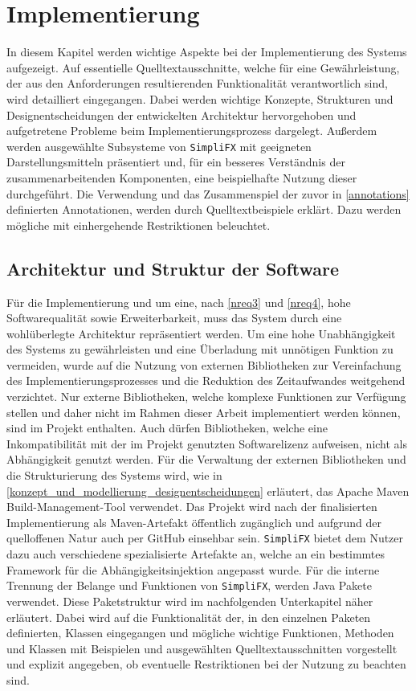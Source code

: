 \chapter{Implementierung}
\label{implementierung}
In diesem Kapitel werden wichtige Aspekte bei der Implementierung des Systems aufgezeigt. Auf essentielle Quelltextausschnitte, welche für eine Gewährleistung, der aus den Anforderungen resultierenden Funktionalität verantwortlich sind, wird detailliert eingegangen. Dabei werden wichtige Konzepte, Strukturen und Designentscheidungen der entwickelten Architektur hervorgehoben und aufgetretene Probleme beim Implementierungsprozess dargelegt. Außerdem werden ausgewählte Subsysteme von \texttt{SimpliFX} mit geeigneten Darstellungsmitteln präsentiert und, für ein besseres Verständnis der zusammenarbeitenden Komponenten, eine beispielhafte Nutzung dieser durchgeführt. Die Verwendung und das Zusammenspiel der zuvor in \autoref{annotations} definierten Annotationen, werden durch Quelltextbeispiele erklärt. Dazu werden mögliche mit einhergehende Restriktionen beleuchtet.
\section{Architektur und Struktur der Software}
\label{architektur}
Für die Implementierung und um eine, nach \autoref{nreq3} und \autoref{nreq4}, hohe Softwarequalität sowie Erweiterbarkeit, muss das System durch eine wohlüberlegte Architektur repräsentiert werden. Um eine hohe Unabhängigkeit des Systems zu gewährleisten und eine Überladung mit unnötigen Funktion zu vermeiden, wurde auf die Nutzung von externen Bibliotheken zur Vereinfachung des Implementierungsprozesses und die Reduktion des Zeitaufwandes weitgehend verzichtet. Nur externe Bibliotheken, welche komplexe Funktionen zur Verfügung stellen und daher nicht im Rahmen dieser Arbeit implementiert werden können, sind im Projekt enthalten. Auch dürfen Bibliotheken, welche eine Inkompatibilität mit der im Projekt genutzten Softwarelizenz aufweisen, nicht als Abhängigkeit genutzt werden. Für die Verwaltung der externen Bibliotheken und die Strukturierung des Systems wird, wie in \autoref{konzept_und_modellierung_designentscheidungen} erläutert, das Apache Maven Build-Management-Tool verwendet. Das Projekt wird nach der finalisierten Implementierung als Maven-Artefakt öffentlich zugänglich und aufgrund der quelloffenen Natur auch per GitHub einsehbar sein. \texttt{SimpliFX} bietet dem Nutzer dazu auch verschiedene spezialisierte Artefakte an, welche an ein bestimmtes Framework für die Abhängigkeitsinjektion angepasst wurde. Für die interne Trennung der Belange und Funktionen von \texttt{SimpliFX}, werden Java Pakete verwendet. Diese Paketstruktur wird im nachfolgenden Unterkapitel näher erläutert. Dabei wird auf die Funktionalität der, in den einzelnen Paketen definierten, Klassen eingegangen und mögliche wichtige Funktionen, Methoden und Klassen mit Beispielen und ausgewählten Quelltextausschnitten vorgestellt und explizit angegeben, ob eventuelle Restriktionen bei der Nutzung zu beachten sind.

